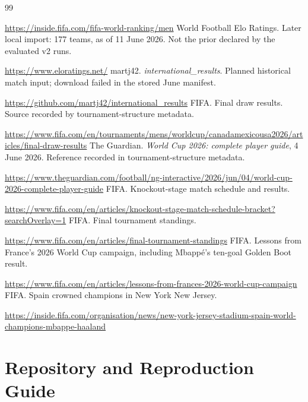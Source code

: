 \documentclass[11pt,a4paper]{article}
\begin{document}
\begin{thebibliography}{99}
\par\url{https://inside.fifa.com/fifa-world-ranking/men}
 World Football Elo Ratings. Later local import: 177 teams,
as of 11 June 2026. Not the prior declared by the evaluated v2 runs.
\par\url{https://www.eloratings.net/}
 martj42. \emph{international\_results}. Planned historical
match input; download failed in the stored June manifest.
\par\url{https://github.com/martj42/international_results}
 FIFA. Final draw results. Source recorded by tournament-structure metadata.
\par\url{https://www.fifa.com/en/tournaments/mens/worldcup/canadamexicousa2026/articles/final-draw-results}
 The Guardian. \emph{World Cup 2026: complete player guide},
4 June 2026. Reference recorded in tournament-structure metadata.
\par\url{https://www.theguardian.com/football/ng-interactive/2026/jun/04/world-cup-2026-complete-player-guide}
 FIFA. Knockout-stage match schedule and results.
\par\url{https://www.fifa.com/en/articles/knockout-stage-match-schedule-bracket?searchOverlay=1}
 FIFA. Final tournament standings.
\par\url{https://www.fifa.com/en/articles/final-tournament-standings}
 FIFA. Lessons from France's 2026 World Cup campaign,
including Mbapp\'{e}'s ten-goal Golden Boot result.
\par\url{https://www.fifa.com/en/articles/lessons-from-frances-2026-world-cup-campaign}
 FIFA. Spain crowned champions in New York New Jersey.
\par\url{https://inside.fifa.com/organisation/news/new-york-jersey-stadium-spain-world-champions-mbappe-haaland}
\end{thebibliography}
\clearpage
\appendix
\section{Repository and Reproduction Guide}
\end{document}
